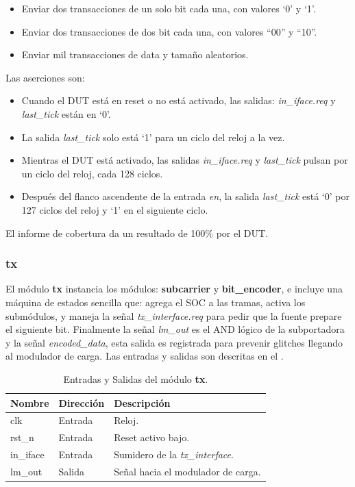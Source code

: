 \documentclass[a4paper, twoside, 11pt]{report}
\begin{document}
\begin{itemize}
  \item Enviar dos transacciones de un solo bit cada una, con valores ‘0’ y ‘1’.
  \item Enviar dos transacciones de dos bit cada una, con valores “00” y “10”.
  \item Enviar mil transacciones de data y tamaño aleatorios.
\end{itemize}

Las aserciones son:

\begin{itemize}
  \item Cuando el DUT está en reset o no está activado, las salidas: \textit{in\_iface.req} y \textit{last\_tick} están en ‘0’.
  \item La salida \textit{last\_tick} solo está ‘1’ para un ciclo del reloj a la vez.
  \item Mientras el DUT está activado, las salidas \textit{in\_iface.req} y \textit{last\_tick} pulsan por un ciclo del reloj, cada 128 ciclos.
  \item Después del flanco ascendente de la entrada \textit{en}, la salida \textit{last\_tick} está ‘0’ por 127 ciclos del reloj y ‘1’ en el siguiente ciclo.
\end{itemize}

El informe de cobertura da un resultado de 100\% por el DUT.

\FloatBarrier
\subsubsection{tx}

El módulo \textbf{tx} instancia los módulos: \textbf{subcarrier} y \textbf{bit\_encoder}, e incluye una máquina de estados sencilla que: agrega el SOC a las tramas, activa los submódulos, y maneja la señal \textit{tx\_interface.req} para pedir que la fuente prepare el siguiente bit. Finalmente la señal \textit{lm\_out} es el AND lógico de la subportadora y la señal \textit{encoded\_data}, esta salida es registrada para prevenir glitches llegando al modulador de carga. Las entradas y salidas son descritas en el .

\begin{table}[htb]
  \centering
  \tablezebra
  \begin{tabulary}{\linewidth}{l|l|L}
    \textbf{Nombre}&\textbf{Dirección}&\textbf{Descripción} \\
    \hline
    clk&Entrada&Reloj. \\
    rst\_n&Entrada&Reset activo bajo. \\
    in\_iface&Entrada&Sumidero de la \textit{tx\_interface}. \\
    lm\_out&Salida&Señal hacia el modulador de carga. \\
  \end{tabulary}
  \caption{Entradas y Salidas del módulo \textbf{tx}.}
  \label{tab:ports_tx}
\end{table}
\end{document}
